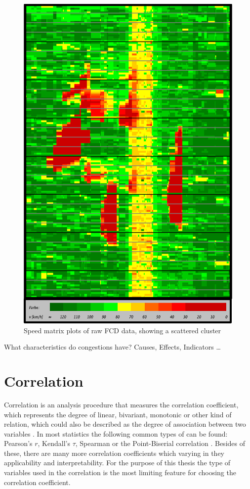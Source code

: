 \documentclass[a4paper,12pt]{report}
\begin{document}
\begin{figure}[h]
	\centering
	\includegraphics[scale=0.8]{./assets/SpeedMatrixPlot_single}
	\caption{Speed matrix plots of raw FCD data, showing a scattered cluster}
	\label{img:speedMatrixPlot_singleCluster}
\end{figure}

What characteristics do congestions have? Causes, Effects, Indicators … 

\section{Correlation}
\label{definition_correlation}
Correlation is an analysis procedure that measures the correlation coefficient, which represents the degree of linear, bivariant, monotonic or other kind of relation, which could also be described as the degree of association between two variables \cite{HerzSchlicherSiegener1992}. In most statistics the following common types of can be found: Pearson's $r$, Kendall's $\tau$, Spearman or the Point-Biserial correlation \cite{Ramzai2020,SPSS2020a,SPSS2020b}. Besides of these, there are many more correlation coefficients which varying in they applicability and interpretability. For the purpose of this thesis the type of variables used in the correlation is the most limiting feature for choosing the correlation coefficient.
 
\end{document}
